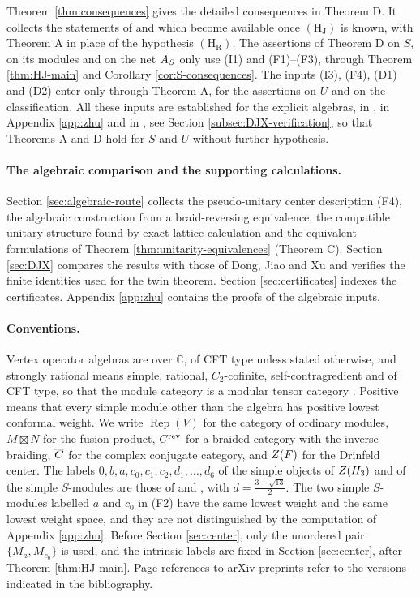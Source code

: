 \documentclass[leqno]{article}
\newcommand{\Cbb}{\ensuremath{\mathbb{C}}}
\let\cal\relax
\newcommand{\cal}{\mathcal}
\newcommand{\ovl}{\overline}
\DeclareMathOperator{\Rep}{Rep}
\numberwithin{equation}{section}
\begin{document}
Theorem \ref{thm:consequences} gives the detailed consequences in Theorem D. It collects the statements of \cite[Theorem 12.4]{Arh26} and \cite[Theorems 7.2, 7.17, 8.3 and 8.6, Corollaries 7.19 and 8.5, Proposition 7.10]{ArhII} which become available once $\mathrm{(H_J)}$ is known, with Theorem A in place of the hypothesis $\mathrm{(H_R)}$. The assertions of Theorem D on $S$, on its modules and on the net $\cal A_S$ only use (I1) and (F1)--(F3), through Theorem \ref{thm:HJ-main} and Corollary \ref{cor:S-consequences}. The inputs (I3), (F4), (D1) and (D2) enter only through Theorem A, for the assertions on $U$ and on the classification. All these inputs are established for the explicit algebras, in \cite{Arh26}, in Appendix \ref{app:zhu} and in \cite{DJX26}, see Section \ref{subsec:DJX-verification}, so that Theorems A and D hold for $S$ and $U$ without further hypothesis.

\paragraph{The algebraic comparison and the supporting calculations.}
Section \ref{sec:algebraic-route} collects the pseudo-unitary center description (F4), the algebraic construction from a braid-reversing equivalence, the compatible unitary structure found by exact lattice calculation and the equivalent formulations of Theorem \ref{thm:unitarity-equivalences} (Theorem C). Section \ref{sec:DJX} compares the results with those of Dong, Jiao and Xu and verifies the finite identities used for the twin theorem. Section \ref{sec:certificates} indexes the certificates. Appendix \ref{app:zhu} contains the proofs of the algebraic inputs.

\paragraph{Conventions.}
Vertex operator algebras are over $\Cbb$, of CFT type unless stated otherwise, and strongly rational means simple, rational, $C_2$-cofinite, self-contragredient and of CFT type, so that the module category is a modular tensor category \cite{Hua08}. Positive means that every simple module other than the algebra has positive lowest conformal weight. We write $\Rep(V)$ for the category of ordinary modules, $M \boxtimes N$ for the fusion product, $\cal C^{\mathrm{rev}}$ for a braided category with the inverse braiding, $\ovl{\cal C}$ for the complex conjugate category, and $Z(\cal F)$ for the Drinfeld center. The labels $0, b, a, c_0, c_1, c_2, d_1, \ldots, d_6$ of the simple objects of $Z(\cal H_3)$ and of the simple $S$-modules are those of \cite{EvG11} and \cite[Table 2]{Arh26}, with $d = \frac{3+\sqrt{13}}2$. The two simple $S$-modules labelled $a$ and $c_0$ in (F2) have the same lowest weight and the same lowest weight space, and they are not distinguished by the computation of Appendix \ref{app:zhu}. Before Section \ref{sec:center}, only the unordered pair $\{M_a,M_{c_0}\}$ is used, and the intrinsic labels are fixed in Section \ref{sec:center}, after Theorem \ref{thm:HJ-main}. Page references to arXiv preprints refer to the versions indicated in the bibliography.
\end{document}
